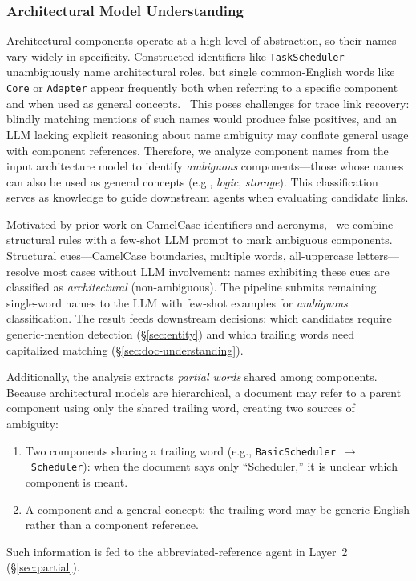\subsubsection{Architectural Model Understanding}\label{sec:model-understanding}

Architectural components operate at a high level of abstraction, so
their names vary widely in specificity.
Constructed identifiers like \texttt{TaskScheduler} unambiguously name
architectural roles, but single common-English words like
\texttt{Core} or \texttt{Adapter} appear frequently both when
referring to a specific component and when used as general
concepts.~
This poses challenges for trace link recovery: blindly matching
mentions of such names would produce false positives, and an LLM
lacking explicit reasoning about name ambiguity may conflate general
usage with component references.
Therefore, we analyze component names from the input architecture model
to identify \emph{ambiguous} components---those whose names can also
be used as general concepts (e.g., \emph{logic}, \emph{storage}).
This classification serves as knowledge to guide downstream agents
when evaluating candidate links.

Motivated by prior work on CamelCase identifiers and
acronyms,~ we combine structural rules with a few-shot
LLM prompt to mark ambiguous components.
Structural cues---CamelCase boundaries, multiple words, all-uppercase
letters---resolve most cases without LLM involvement: names exhibiting
these cues are classified as \emph{architectural} (non-ambiguous).
The pipeline submits remaining single-word names to the LLM with
few-shot examples for \emph{ambiguous} classification.
The result feeds downstream decisions:
which candidates require generic-mention detection
(\S\ref{sec:entity}) and
which trailing words need capitalized matching
(\S\ref{sec:doc-understanding}).

Additionally, the analysis extracts \emph{partial words} shared among
components.
Because architectural models are hierarchical, a document may refer to
a parent component using only the shared trailing word, creating two
sources of ambiguity:
\begin{enumerate}
  \item Two components sharing a trailing word
    (e.g., \texttt{BasicScheduler}~$\to$~\texttt{Scheduler}): when the
    document says only ``Scheduler,'' it is unclear which component is
    meant.
  \item A component and a general concept: the trailing word may be
    generic English rather than a component reference.
\end{enumerate}
Such information is fed to the abbreviated-reference agent in Layer~2
(\S\ref{sec:partial}).

